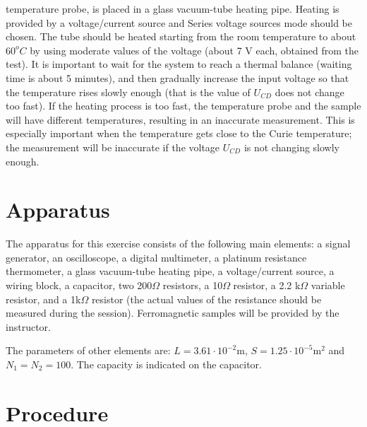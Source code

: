 \documentclass[12pt]{article}
\begin{document}
temperature probe, is placed in a glass vacuum-tube heating pipe. Heating is provided
by a voltage/current source and Series voltage sources mode should be chosen. The tube
should be heated starting from the room temperature to about $60^oC$ by using moderate
values of the voltage (about 7 V each, obtained from the test). It is important to wait
for the system to reach a thermal balance (waiting time is about 5 minutes), and then
gradually increase the input voltage so that the temperature rises slowly enough (that is
the value of $U_{CD}$ does not change too fast). If the heating process is too fast, the temperature probe and the sample will have different temperatures, resulting in an inaccurate
measurement. This is especially important when the temperature gets close to the Curie
temperature; the measurement will be inaccurate if the voltage $U_{CD}$ is not changing slowly
enough.
\section{Apparatus}
The apparatus for this exercise consists of the following main elements: a signal generator, an oscilloscope, a digital multimeter, a platinum resistance thermometer, a glass
vacuum-tube heating pipe, a voltage/current source, a wiring block, a capacitor, two 200$\Omega$ resistors, a 10$\Omega$ resistor, a 2.2 k$\Omega$ variable resistor, and a 1k$\Omega$ resistor (the actual values of the resistance should be measured during the session). Ferromagnetic samples will be provided by the instructor.
\par The parameters of other elements are: $L=3.61\cdot10^{-2}$m, $S=1.25\cdot10^{-5}$m$^2$ and $N_1=N_2=100.$ The capacity is indicated on the capacitor.
\section{Procedure}
\end{document}
